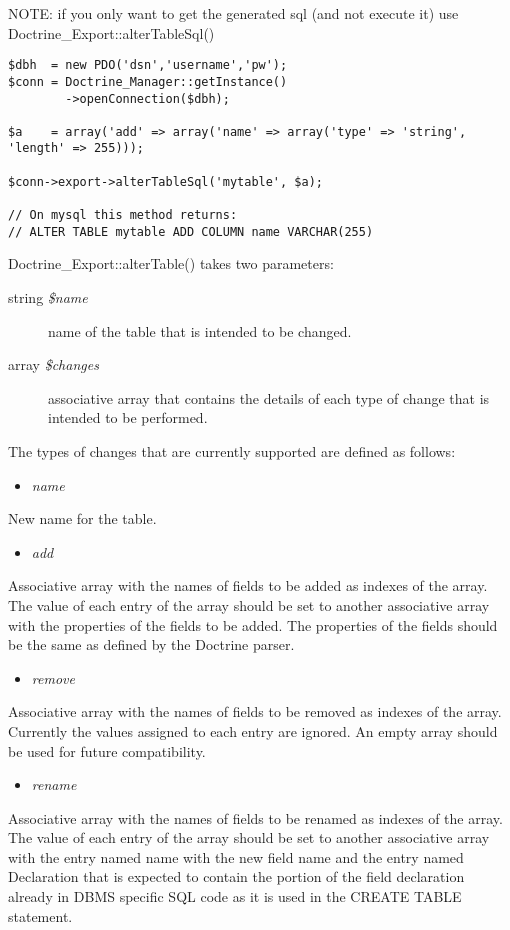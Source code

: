 \documentclass[11pt,a4paper]{report}
\begin{document}
NOTE: if you only want to get the generated sql (and not execute it) use Doctrine\_Export::alterTableSql()

\begin{verbatim}
$dbh  = new PDO('dsn','username','pw');
$conn = Doctrine_Manager::getInstance()
        ->openConnection($dbh);

$a    = array('add' => array('name' => array('type' => 'string', 'length' => 255)));

$conn->export->alterTableSql('mytable', $a);

// On mysql this method returns:
// ALTER TABLE mytable ADD COLUMN name VARCHAR(255)
\end{verbatim}

Doctrine\_Export::alterTable() takes two parameters:

\begin{description}
\item[string \textsl{\$name}] {name of the table that is intended to be changed.}
\item[array \textsl{\$changes}] {associative array that contains the details of each type of change that is intended to be performed.}
\end{description}

The types of changes that are currently supported are defined as follows:

\begin{itemize}
\item{\textsl{name}}
\end{itemize}
New name for the table.

\begin{itemize}
\item{\textsl{add}}
\end{itemize}
Associative array with the names of fields to be added as indexes of the array. The value of each entry of the array should be set to another associative array with the properties of the fields to be added. The properties of the fields should be the same as defined by the Doctrine parser.

\begin{itemize}
\item{\textsl{remove}}
\end{itemize}
Associative array with the names of fields to be removed as indexes of the array. Currently the values assigned to each entry are ignored. An empty array should be used for future compatibility.

\begin{itemize}
\item{\textsl{rename}}
\end{itemize}
Associative array with the names of fields to be renamed as indexes of the array. The value of each entry of the array should be set to another associative array with the entry named name with the new field name and the entry named Declaration that is expected to contain the portion of the field declaration already in DBMS specific SQL code as it is used in the CREATE TABLE statement.
\end{document}
